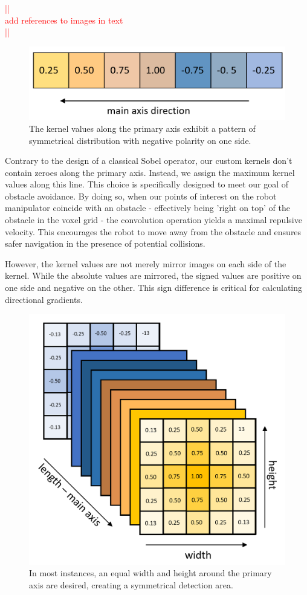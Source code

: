 \documentclass[a4paper]{article}
\newcommand\todocomment[1]{\textcolor{red}{||\\ #1\\||}}
\begin{document}
\todocomment{add references to images in text}

\begin{figure}[H]
	\centering
	\includegraphics[width=0.8\linewidth]{kernel-mainvalues-colored.png}
	\caption{The kernel values along the primary axis exhibit a pattern of symmetrical distribution with negative polarity on one side.} 
	\label{Kernel main axis}
\end{figure}

Contrary to the design of a classical Sobel operator, our custom kernels don't contain zeroes along the primary axis. Instead, we assign the maximum kernel values along this line. This choice is specifically designed to meet our goal of obstacle avoidance. By doing so, when our points of interest on the robot manipulator coincide with an obstacle - effectively being 'right on top' of the obstacle in the voxel grid - the convolution operation yields a maximal repulsive velocity. This encourages the robot to move away from the obstacle and ensures safer navigation in the presence of potential collisions.

However, the kernel values are not merely mirror images on each side of the kernel. While the absolute values are mirrored, the signed values are positive on one side and negative on the other. This sign difference is critical for calculating directional gradients.

\begin{figure}[H]
	\centering
	\includegraphics[width=0.85\linewidth]{kernel-matrix.png}
	\caption{In most instances, an equal width and height around the primary axis are desired, creating a symmetrical detection area.} 
	\label{Kernel matrix}
\end{figure}
\end{document}
